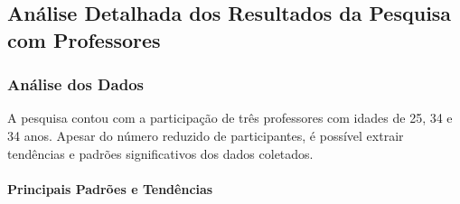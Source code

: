 \subsection{Análise Detalhada dos Resultados da Pesquisa com Professores}

\subsubsection{Análise dos Dados}

A pesquisa contou com a participação de três professores com idades de 25, 34 e 34 anos. Apesar do número reduzido de participantes, é possível extrair tendências e padrões significativos dos dados coletados.

\paragraph{Principais Padrões e Tendências}

